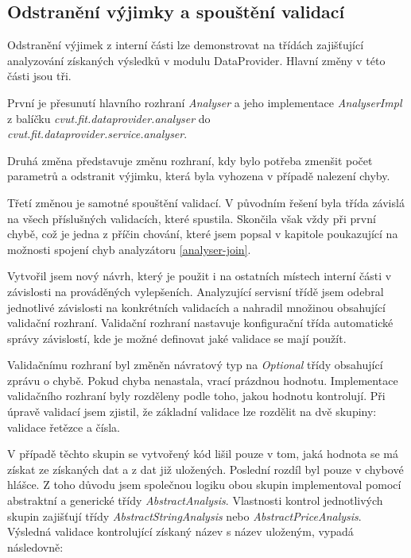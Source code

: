 \documentclass[thesis=B,czech]{FITthesis}[2012/06/26]
\begin{document}
\subsection{Odstranění výjimky a spouštění validací}
Odstranění výjimek z interní části lze demonstrovat na třídách zajišťující analyzování získaných výsledků v modulu DataProvider. Hlavní změny v této části jsou tři.
\par
První je přesunutí hlavního rozhraní \textit{Analyser} a jeho implementace
\textit{AnalyserImpl} z balíčku \textit{cvut.fit.dataprovider.analyser} 
do  \\
\textit{cvut.fit.dataprovider.service.analyser}. 
\par
Druhá změna představuje změnu rozhraní, kdy bylo potřeba
zmenšit počet parametrů a odstranit výjimku, která byla vyhozena v případě nalezení chyby. 
\par
Třetí změnou je samotné spouštění validací. V původním řešení byla třída závislá na všech příslušných validacích, které spustila.
Skončila však vždy při první chybě, což je jedna 
z příčin chování, které jsem popsal v kapitole poukazující na možnosti spojení chyb analyzátoru \autoref{analyser-join}.
\par
Vytvořil jsem nový návrh, který je použit i na ostatních místech interní části v závislosti na
prováděných vylepšeních. Analyzující servisní třídě jsem odebral jednotlivé závislosti na konkrétních validacích a nahradil množinou 
obsahující validační rozhraní. Validační rozhraní nastavuje konfigurační třída automatické správy závislostí, kde je možné
definovat jaké validace se mají použít.
\par
Validačnímu rozhraní byl změněn návratový typ na \textit{Optional} třídy obsahující zprávu o chybě. Pokud chyba nenastala, vrací
prázdnou hodnotu. Implementace validačního rozhraní byly rozděleny podle toho, jakou hodnotu kontrolují.
Při úpravě validací jsem zjistil, že základní validace lze rozdělit na dvě skupiny: validace řetězce a čísla.
\par
V případě těchto skupin se vytvořený kód lišil pouze v tom, jaká hodnota se má získat ze získaných dat a z dat již uložených.
Poslední rozdíl byl pouze v chybové hlášce. Z toho důvodu jsem společnou logiku obou skupin implementoval
pomocí abstraktní a generické třídy \textit{AbstractAnalysis}. Vlastnosti kontrol jednotlivých skupin zajišťují třídy \textit{AbstractStringAnalysis} 
nebo \textit{AbstractPriceAnalysis}. Výsledná validace kontrolující získaný název s název uloženým, vypadá následovně:
\end{document}
